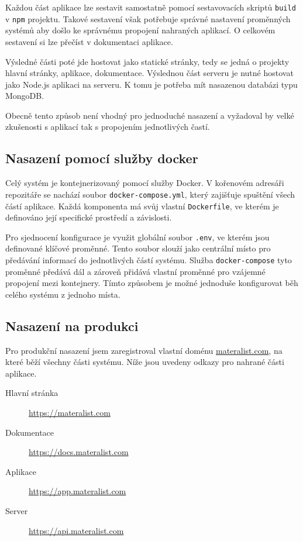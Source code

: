 Každou část aplikace lze sestavit samostatně pomocí sestavovacích skriptů \verb|build| v \verb|npm| projektu.
Takové sestavení však potřebuje správné nastavení proměnných systémů aby došlo ke správnému propojení nahraných aplikací.
O celkovém sestavení si lze přečíst v dokumentaci aplikace.

Výsledné části poté jde hostovat jako statické stránky, tedy se jedná o projekty hlavní stránky, aplikace, dokumentace.
Výslednou část serveru je nutné hostovat jako Node.js aplikaci na serveru.
K tomu je potřeba mít nasazenou databázi typu MongoDB.

Obecně tento způsob není vhodný pro jednoduché nasazení a vyžadoval by velké zkušenosti s aplikací tak s propojením jednotlivých častí. 

\subsection{Nasazení pomocí služby docker}

Celý systém je kontejnerizovaný pomocí služby Docker.
V kořenovém adresáři repozitáře se nachází soubor \texttt{docker-compose.yml}, který zajišťuje spuštění všech částí aplikace. 
Každá komponenta má svůj vlastní \texttt{Dockerfile}, ve kterém je definováno její specifické prostředí a závislosti.

Pro sjednocení konfigurace je využit globální soubor \texttt{.env}, ve kterém jsou definované klíčové proměnné. 
Tento soubor slouží jako centrální místo pro předávání informací do jednotlivých částí systému. 
Služba \texttt{docker-compose} tyto proměnné předává dál a zároveň přidává vlastní proměnné pro vzájemné propojení mezi kontejnery. 
Tímto způsobem je možné jednoduše konfigurovat běh celého systému z jednoho místa.

\subsection{Nasazení na produkci}

Pro produkční nasazení jsem zaregistroval vlastní doménu \href{https://materalist.com}{materalist.com}, na které běží všechny části systému.  
Níže jsou uvedeny odkazy pro nahrané části aplikace.

\begin{description}
    \item[Hlavní stránka] \href{https://materalist.com}{https://materalist.com}
    \item[Dokumentace] \href{https://docs.materalist.com}{https://docs.materalist.com}
    \item[Aplikace] \href{https://app.materalist.com}{https://app.materalist.com}
    \item[Server] \href{https://api.materalist.com}{https://api.materalist.com}
\end{description}

